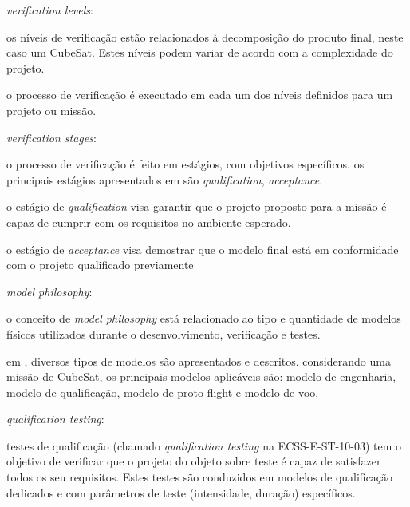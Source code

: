 \begin{alineas}
    \item \textit{verification levels}:
    \begin{alineas}
        \item os níveis de verificação estão relacionados à decomposição do produto final, neste caso um CubeSat. Estes níveis podem variar de acordo com a complexidade do projeto.
        \item o processo de verificação é executado em cada um dos níveis definidos para um projeto ou missão.
    \end{alineas}

    \item \textit{verification stages}:
    \begin{alineas}
        \item o processo de verificação é feito em estágios, com objetivos específicos. os principais estágios apresentados em \textcite{ecss-e-st-10-02} são \textit{qualification}, \textit{acceptance}.

        \item o estágio de \textit{qualification} visa garantir que o projeto proposto para a missão é capaz de cumprir com os requisitos no ambiente esperado.
        \item o estágio de \textit{acceptance} visa demostrar que o modelo final  está em conformidade com o projeto qualificado previamente
    \end{alineas}

    \item \textit{model philosophy}:
    \begin{alineas}
        \item o conceito de \textit{model philosophy} está relacionado ao tipo e quantidade de modelos físicos utilizados durante o desenvolvimento, verificação e testes.
        \item em \cite{ecss-e-hb-10-02}, diversos tipos de modelos são apresentados e descritos. considerando uma missão de CubeSat, os principais modelos aplicáveis são: modelo de engenharia, modelo de qualificação, modelo de proto-flight e modelo de voo.
    \end{alineas}

    \item \textit{qualification testing}:
    \begin{alineas}
        \item testes de qualificação (chamado \textit{qualification testing} na ECSS-E-ST-10-03) tem o objetivo de verificar que o projeto do objeto sobre teste é capaz de satisfazer todos os seu requisitos. Estes testes são conduzidos em modelos de qualificação dedicados e com parâmetros de teste (intensidade, duração) específicos.
    \end{alineas}


\end{alineas}
